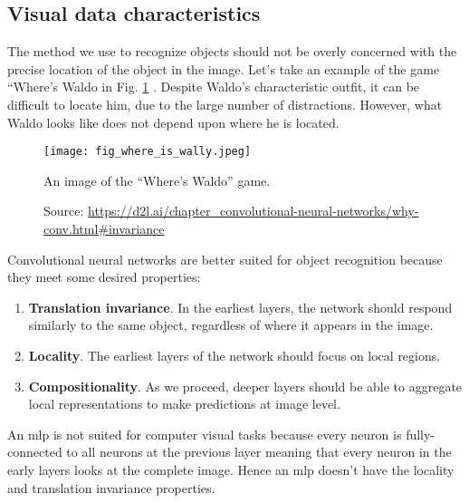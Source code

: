 \subsection{Visual data characteristics}
The method we use to recognize objects should not be overly concerned with the precise location of the object in the image. Let's take an example of the game “Where’s Waldo in Fig. \ref{fig:where_is_wally} \cite{zhang2021dive}. Despite Waldo's characteristic outfit, it can be difficult to locate him, due to the large number of distractions. However, what Waldo looks like does not depend upon where he is located. 
\begin{figure}[ht]
    \begin{center}       
    \texttt{[image: fig\_where\_is\_wally.jpeg]}
    \caption[An image of the “Where’s Waldo” game]{An image of the “Where’s Waldo” game.}
    \caption*{Source: \href{https://d2l.ai/chapter\_convolutional-neural-networks/why-conv.html\#invariance}{https://d2l.ai/chapter\_convolutional-neural-networks/why-conv.html\#invariance}}
    \label{fig:where_is_wally}
    \end{center}
\end{figure}

Convolutional neural networks are better suited for object recognition because they meet some desired properties:
\begin{enumerate}
    \item \textbf{Translation invariance}. In the earliest layers, the network should respond similarly to the same object, regardless of where it appears in the image. 
    \item \textbf{Locality}. The earliest layers of the network should focus on local regions.
    \item \textbf{Compositionality}. As we proceed, deeper layers should be able to aggregate local representations to make predictions at image level.
\end{enumerate}

An \acrshort{mlp} is not suited for computer visual tasks because every neuron is fully-connected to all neurons at the previous layer meaning that every neuron in the early layers looks at the complete image. Hence an \acrshort{mlp} doesn't have the locality and translation invariance properties.

